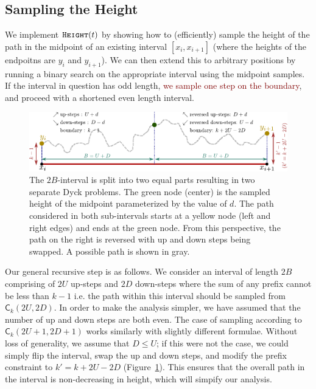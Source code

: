 \subsection{Sampling the Height}
\label{sec:sampling_the_height}
We implement $\texttt{\textsc{Height}}(t)$ by showing how to (efficiently) sample the height of the path in the midpoint of an existing interval $[x_i, x_{i+1}]$
(where the heights of the endpoitns are $y_i$ and $y_{i+1}$).
We can then extend this to arbitrary positions by running a binary search on the appropriate interval using the midpoint samples.
If the interval in question has odd length, \textcolor{Maroon}{we sample one step on the boundary}, 
and proceed with a shortened even length interval.
\begin{figure}[htpb]
    \centering
    \includegraphics[width=\textwidth]{images/dyck_height_sampling.pdf}
    \caption{The $2B$-interval is split into two equal parts resulting in two separate Dyck problems.
             The green node (center) is the sampled height of the midpoint parameterized by the value of $d$.
             The path considered in both sub-intervals starts at a yellow node (left and right edges) and ends at the green node.
             From this perspective, the path on the right is reversed with up and down steps being swapped.
             A possible path is shown in gray.}
    \label{fig:dyck_height_sampling}
\end{figure}

Our general recursive step is as follows.
We consider an interval of length $2B$ comprising of $2U$ up-steps and $2D$ down-steps where the sum of any prefix cannot be less than $k-1$
i.e. the path within this interval should be sampled from $\mathsf C_k(2U,2D)$.
In order to make the analysis simpler, we have assumed that the number of up and down steps are both even.
The case of sampling according to $\mathsf C_k(2U+1, 2D+1)$ works similarly with slightly different formulae.
Without loss of generality, we assume that $D\le U$; if this were not the case, we could simply flip the interval,
swap the up and down steps, and modify the prefix constraint to $k'=k+2U-2D$ (Figure~\ref{fig:dyck_height_sampling}).
This ensures that the overall path in the interval is non-decreasing in height, which will simpify our analysis.

